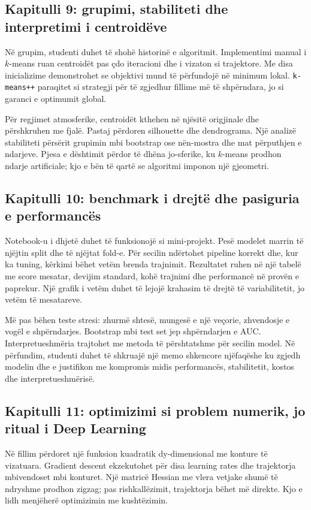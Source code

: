 \documentclass[12pt,a4paper,oneside]{book}
\begin{document}
\subsection*{Kapitulli 9: grupimi, stabiliteti dhe interpretimi i centroidëve}
Në grupim, studenti duhet të shohë historinë e algoritmit. Implementimi manual i $k$-means ruan centroidët pas çdo iteracioni dhe i vizaton si trajektore. Me disa inicializime demonstrohet se objektivi mund të përfundojë në minimum lokal. \texttt{k-means++} paraqitet si strategji për të zgjedhur fillime më të shpërndara, jo si garanci e optimumit global.

Për regjimet atmosferike, centroidët kthehen në njësitë origjinale dhe përshkruhen me fjalë. Pastaj përdoren silhouette dhe dendrograma. Një analizë stabiliteti përsërit grupimin mbi bootstrap ose nën-mostra dhe mat përputhjen e ndarjeve. Pjesa e dështimit përdor të dhëna jo-sferike, ku $k$-means prodhon ndarje artificiale; kjo e bën të qartë se algoritmi imponon një gjeometri.

\subsection*{Kapitulli 10: benchmark i drejtë dhe pasiguria e performancës}
Notebook-u i dhjetë duhet të funksionojë si mini-projekt. Pesë modelet marrin të njëjtin split dhe të njëjtat fold-e. Për secilin ndërtohet pipeline korrekt dhe, kur ka tuning, kërkimi bëhet vetëm brenda trajnimit. Rezultatet ruhen në një tabelë me score mesatar, devijim standard, kohë trajnimi dhe performancë në provën e paprekur. Një grafik i vetëm duhet të lejojë krahasim të drejtë të variabilitetit, jo vetëm të mesatareve.

Më pas bëhen teste stresi: zhurmë shtesë, mungesë e një veçorie, zhvendosje e vogël e shpërndarjes. Bootstrap mbi test set jep shpërndarjen e AUC. Interpretueshmëria trajtohet me metoda të përshtatshme për secilin model. Në përfundim, studenti duhet të shkruajë një memo shkencore njëfaqëshe ku zgjedh modelin dhe e justifikon me kompromis midis performancës, stabilitetit, kostos dhe interpretueshmërisë.

\subsection*{Kapitulli 11: optimizimi si problem numerik, jo ritual i Deep Learning}
Në fillim përdoret një funksion kuadratik dy-dimensional me konture të vizatuara. Gradient descent ekzekutohet për disa learning rates dhe trajektorja mbivendoset mbi konturet. Një matricë Hessian me vlera vetjake shumë të ndryshme prodhon zigzag; pas rishkallëzimit, trajektorja bëhet më direkte. Kjo e lidh menjëherë optimizimin me kushtëzimin.
\end{document}
